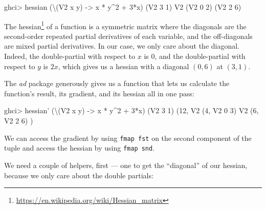 \documentclass[]{article}
\newenvironment{Shaded}{}{}
\newcommand{\DataTypeTok}[1]{\textcolor[rgb]{0.56,0.13,0.00}{{#1}}}
\newcommand{\DecValTok}[1]{\textcolor[rgb]{0.25,0.63,0.44}{{#1}}}
\newcommand{\OtherTok}[1]{\textcolor[rgb]{0.00,0.44,0.13}{{#1}}}
\newcommand{\FunctionTok}[1]{\textcolor[rgb]{0.02,0.16,0.49}{{#1}}}
\newcommand{\NormalTok}[1]{{#1}}
\renewcommand{\href}[2]{#2\footnote{\url{#1}}}
\begin{document}
\begin{Shaded}
\begin{Highlighting}[]
\NormalTok{ghci}\FunctionTok{>} \NormalTok{hessian (\textbackslash{}(}\DataTypeTok{V2} \NormalTok{x y) }\OtherTok{->} \NormalTok{x }\FunctionTok{*} \NormalTok{y}\FunctionTok{^}\DecValTok{2} \FunctionTok{+} \DecValTok{3}\FunctionTok{*}\NormalTok{x) (}\DataTypeTok{V2} \DecValTok{3} \DecValTok{1}\NormalTok{)}
\DataTypeTok{V2} \NormalTok{(}\DataTypeTok{V2} \DecValTok{0} \DecValTok{2}\NormalTok{)}
   \NormalTok{(}\DataTypeTok{V2} \DecValTok{2} \DecValTok{6}\NormalTok{)}
\end{Highlighting}
\end{Shaded}

The \href{https://en.wikipedia.org/wiki/Hessian_matrix}{hessian} of a
function is a symmetric matrix where the diagonals are the second-order
repeated partial derivatives of each variable, and the off-diagonals are
mixed partial derivatives. In our case, we only care about the diagonal.
Indeed, the double-partial with respect to \(x\) is \(0\), and the
double-partial with respect to \(y\) is \(2x\), which gives us a hessian
with a diagonal \((0, 6)\) at \((3, 1)\).

The \emph{ad} package generously gives us a function that lets us
calculate the function's result, its gradient, and its hessian all in
one pass:

\begin{Shaded}
\begin{Highlighting}[]
\NormalTok{ghci}\FunctionTok{>} \NormalTok{hessian' (\textbackslash{}(}\DataTypeTok{V2} \NormalTok{x y) }\OtherTok{->} \NormalTok{x }\FunctionTok{*} \NormalTok{y}\FunctionTok{^}\DecValTok{2} \FunctionTok{+} \DecValTok{3}\FunctionTok{*}\NormalTok{x) (}\DataTypeTok{V2} \DecValTok{3} \DecValTok{1}\NormalTok{)}
\NormalTok{(}\DecValTok{12}\NormalTok{, }\DataTypeTok{V2} \NormalTok{(}\DecValTok{4}\NormalTok{, }\DataTypeTok{V2} \DecValTok{0} \DecValTok{3}\NormalTok{)}
     \DataTypeTok{V2} \NormalTok{(}\DecValTok{6}\NormalTok{, }\DataTypeTok{V2} \DecValTok{2} \DecValTok{6}\NormalTok{)}
\NormalTok{)}
\end{Highlighting}
\end{Shaded}

We can access the gradient by using \texttt{fmap\ fst} on the second
component of the tuple and access the hessian by using
\texttt{fmap\ snd}.

We need a couple of helpers, first --- one to get the ``diagonal'' of
our hessian, because we only care about the double partials:
\end{document}
